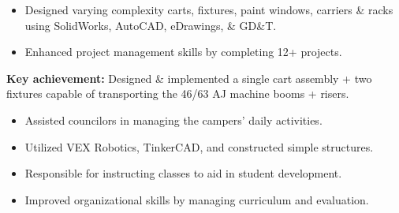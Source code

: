 \documentclass[10pt,a4paper]{altacv}
\begin{document}

%

\begin{fullwidth}
\makecvheader
\end{fullwidth}

%





\begin{itemize}
\item Designed varying complexity carts, fixtures, paint windows, carriers \& racks using SolidWorks, AutoCAD, eDrawings, \& GD\&T.
\item Enhanced project management skills by completing 12+ projects.
\end{itemize}

\textbf{Key achievement:} Designed \& implemented a single cart assembly + two fixtures capable of transporting the 46/63 AJ machine booms + risers.

\divider
%



\begin{itemize}
  \item Assisted councilors in managing the campers' daily activities.
  \item Utilized VEX Robotics, TinkerCAD, and constructed simple structures.
\end{itemize}

\divider
%



\begin{itemize}
  \item Responsible for instructing classes to aid in student development.
  \item Improved organizational skills by managing curriculum and evaluation.
\end{itemize}
\end{document}
